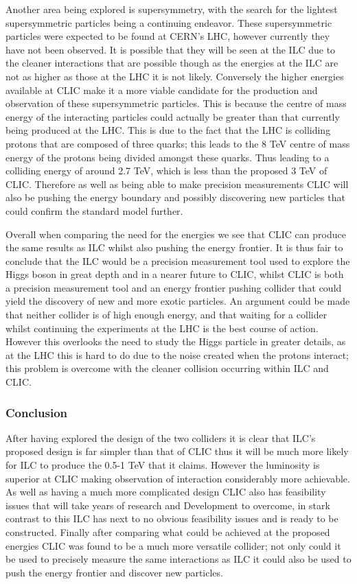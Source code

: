 Another area being explored is supersymmetry, with the search for the lightest supersymmetric particles being a continuing endeavor. These supersymmetric particles were expected to be found at CERN's LHC, however currently they have not been observed. It is possible that they will be seen at the ILC due to the cleaner interactions that are possible though as the energies at the ILC are not as higher as those at the LHC it is not likely. Conversely the higher energies available at CLIC make it a more viable candidate for the production and observation of these supersymmetric particles. This is because the centre of mass energy of the interacting particles could actually be greater than that currently being produced at the LHC. This is due to the fact that the LHC is colliding protons that are composed of three quarks; this leads to the 8 TeV centre of mass energy\cite{ATLAS:8TeV} of the protons being divided amongst these quarks. Thus leading to a colliding energy of around 2.7 TeV, which is less than the proposed 3 TeV of CLIC. Therefore as well as being able to make precision measurements CLIC will also be pushing the energy boundary and possibly discovering new particles that could confirm the standard model further.

Overall when comparing the need for the energies we see that CLIC can produce the same results as ILC whilst also pushing the energy frontier. It is thus fair to conclude that the ILC would be a precision measurement tool used to explore the Higgs boson in great depth and in a nearer future to CLIC, whilst CLIC is both a precision measurement tool and an energy frontier pushing collider that could yield the discovery of new and more exotic particles. An argument could be made that neither collider is of high enough energy, and that waiting for a collider whilst continuing the experiments at the LHC is the best course of action. However this overlooks the need to study the Higgs particle in greater details, as at the LHC this is hard to do due to the noise created when the protons interact; this problem is overcome with the cleaner collision occurring within ILC and CLIC.
	
\subsubsection{Conclusion}
After having explored the design of the two colliders it is clear that ILC's proposed design is far simpler than that of CLIC thus it will be much more likely for ILC to produce the 0.5-1 TeV that it claims. However the luminosity is superior at CLIC making observation of interaction considerably more achievable. As well as having a much more complicated design CLIC also has feasibility issues that will take years of research and Development to overcome, in stark contrast to this ILC has next to no obvious feasibility issues and is ready to be constructed. Finally after comparing what could be achieved at the proposed energies CLIC was found to be a much more versatile collider; not only could it be used to precisely measure the same interactions as ILC it could also be used to push the energy frontier and discover new particles.

